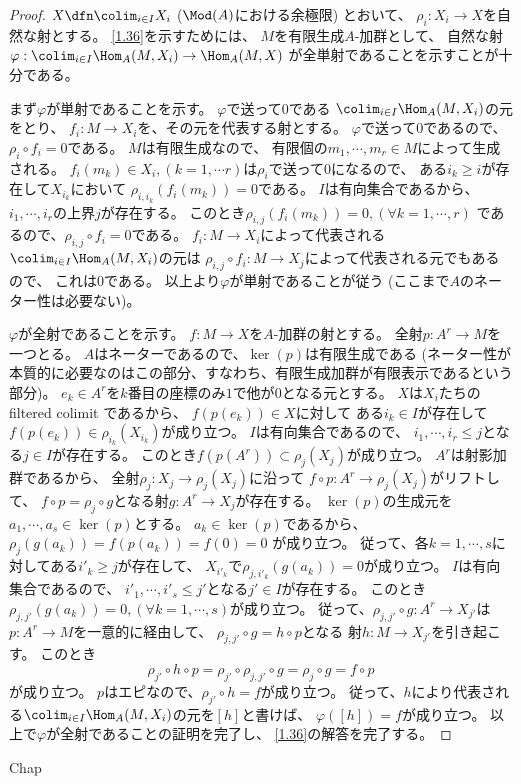 \documentclass[uplatex,dvipdfmx]{jsarticle}
\begin{document}
\begin{proof}
  \(X\dfn \colim_{i\in I}X_i\) (\(\Mod(A)\)における余極限) とおいて、
  \(\rho_i:X_i\to X\)を自然な射とする。
  \autoref{1.36}を示すためには、
  \(M\)を有限生成\(A\)-加群として、
  自然な射\(\varphi: \colim_{i\in I}\Hom_A(M,X_i) \to \Hom_A(M,X)\)
  が全単射であることを示すことが十分である。

  まず\(\varphi\)が単射であることを示す。
  \(\varphi\)で送って\(0\)である
  \(\colim_{i\in I}\Hom_A(M,X_i)\)の元をとり、
  \(f_i:M\to X_i\)を、その元を代表する射とする。
  \(\varphi\)で送って\(0\)であるので、
  \(\rho_i\circ f_i = 0\)である。
  \(M\)は有限生成なので、
  有限個の\(m_1,\cdots, m_r\in M\)によって生成される。
  \(f_i(m_k)\in X_i, (k=1,\cdots r)\)は\(\rho_i\)で送って\(0\)になるので、
  ある\(i_k \geq i\)が存在して\(X_{i_k}\)において
  \(\rho_{i,i_k}(f_i(m_k)) = 0\)である。
  \(I\)は有向集合であるから、
  \(i_1,\cdots, i_r\)の上界\(j\)が存在する。
  このとき\(\rho_{i,j}(f_i(m_k)) = 0, (\forall k =1,\cdots,r)\)
  であるので、\(\rho_{i,j}\circ f_i = 0\)である。
  \(f_i:M\to X_i\)によって代表される\(\colim_{i\in I}\Hom_A(M,X_i)\)の元は
  \(\rho_{i,j}\circ f_i:M\to X_j\)によって代表される元でもあるので、
  これは\(0\)である。
  以上より\(\varphi\)が単射であることが従う
  (ここまで\(A\)のネーター性は必要ない)。

  \(\varphi\)が全射であることを示す。
  \(f:M\to X\)を\(A\)-加群の射とする。
  全射\(p:A^r\to M\)を一つとる。
  \(A\)はネーターであるので、\(\ker(p)\)は有限生成である
  (ネーター性が本質的に必要なのはこの部分、すなわち、有限生成加群が有限表示であるという部分)。
  \(e_k\in A^r\)を\(k\)番目の座標のみ\(1\)で他が\(0\)となる元とする。
  \(X\)は\(X_i\)たちの filtered colimit であるから、
  \(f(p(e_k))\in X\)に対して
  ある\(i_k\in I\)が存在して
  \(f(p(e_k)) \in \rho_{i_k}(X_{i_k})\)が成り立つ。
  \(I\)は有向集合であるので、
  \(i_1,\cdots, i_r \leq j\)となる\(j\in I\)が存在する。
  このとき\(f(p(A^r)) \subset \rho_j(X_j)\)が成り立つ。
  \(A^r\)は射影加群であるから、
  全射\(\rho_j:X_j\to \rho_j(X_j)\)に沿って
  \(f\circ p:A^r\to \rho_j(X_j)\)がリフトして、
  \(f\circ p = \rho_j \circ g\)となる射\(g:A^r\to X_j\)が存在する。
  \(\ker(p)\)の生成元を\(a_1,\cdots,a_s\in \ker(p)\)とする。
  \(a_k\in \ker(p)\)であるから、
  \(\rho_j(g(a_k)) = f(p(a_k)) = f(0) = 0\)
  が成り立つ。
  従って、各\(k = 1,\cdots, s\)に対してある\(i'_k\geq j\)が存在して、
  \(X_{i'_k}\)で\(\rho_{j,i'_k}(g(a_k)) = 0\)が成り立つ。
  \(I\)は有向集合であるので、
  \(i'_1,\cdots, i'_s \leq j'\)となる\(j'\in I\)が存在する。
  このとき\(\rho_{j,j'}(g(a_k)) = 0, (\forall k = 1,\cdots ,s)\)が成り立つ。
  従って、\(\rho_{j,j'}\circ g: A^r\to X_{j'}\)は
  \(p:A^r\to M\)を一意的に経由して、
  \(\rho_{j,j'}\circ g = h\circ p\)となる
  射\(h:M\to X_{j'}\)を引き起こす。
  このとき
  \[
  \rho_{j'}\circ h \circ p = \rho_{j'}\circ \rho_{j,j'}\circ g = \rho_j\circ g
  = f\circ p
  \]
  が成り立つ。
  \(p\)はエピなので、\(\rho_{j'}\circ h = f\)が成り立つ。
  従って、\(h\)により代表される\(\colim_{i\in I}\Hom_A(M,X_i)\)の元を\([h]\)と書けば、
  \(\varphi([h]) = f\)が成り立つ。
  以上で\(\varphi\)が全射であることの証明を完了し、
  \autoref{1.36}の解答を完了する。
\end{proof}




\ifcsname Chap\endcsname\else
\printbibliography
\end{document}

